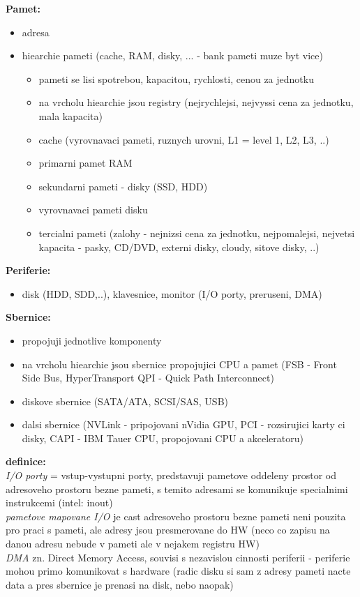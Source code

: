 \documentclass[a4paper, 11pt]{article}
\begin{document}
\noindent\textbf{Pamet:} \label{hiearchie-pameti}
\begin{itemize}
    \item adresa
    \item hiearchie pameti (cache, RAM, disky, ... - bank pameti muze byt vice)
    \begin{itemize}
        \item pameti se lisi spotrebou, kapacitou, rychlosti, cenou za jednotku
        \item na vrcholu hiearchie jsou registry (nejrychlejsi, nejvyssi cena za jednotku, mala kapacita)
        \item cache (vyrovnavaci pameti, ruznych urovni, L1 = level 1, L2, L3, ..)
        \item primarni pamet RAM
        \item sekundarni pameti - disky (SSD, HDD)
        \item vyrovnavaci pameti disku
        \item tercialni pameti (zalohy - nejnizsi cena za jednotku, nejpomalejsi, nejvetsi kapacita - pasky, CD/DVD, externi disky, cloudy, sitove disky, ..) \\
    \end{itemize}
\end{itemize}

\noindent\textbf{Periferie:}
\begin{itemize}
    \item disk (HDD, SDD,..), klavesnice, monitor (I/O porty, preruseni, DMA) \\
\end{itemize}

\noindent\textbf{Sbernice:}
\begin{itemize}
    \item propojuji jednotlive komponenty
    \item na vrcholu hiearchie jsou sbernice propojujici CPU a pamet (FSB - Front Side Bus, HyperTransport QPI - Quick Path Interconnect)
    \item diskove sbernice (SATA/ATA, SCSI/SAS, USB)
    \item dalsi sbernice (NVLink - pripojovani nVidia GPU, PCI - rozsirujici karty ci disky, CAPI - IBM Tauer CPU, propojovani CPU a akceleratoru) \\
\end{itemize}
 
\noindent\textbf{definice:} \\[0.5em] \label{i-o}
\textit{I/O porty} = vstup-vystupni porty, predstavuji pametove oddeleny prostor od adresoveho prostoru bezne pameti, s temito adresami se komunikuje specialnimi instrukcemi (intel: inout) \\[0.2em]
\textit{pametove mapovane I/O} je cast adresoveho prostoru bezne pameti neni pouzita pro praci s pameti, ale adresy jsou presmerovane do HW (neco co zapisu na danou adresu nebude v pameti ale v nejakem registru HW) \\[0.2em]
\textit{DMA} zn. Direct Memory Access, souvisi s nezavislou cinnosti periferii - periferie mohou primo komunikovat s hardware (radic disku si sam z adresy pameti nacte data a pres sbernice je prenasi na disk, nebo naopak) \\[0.2em]
\end{document}
